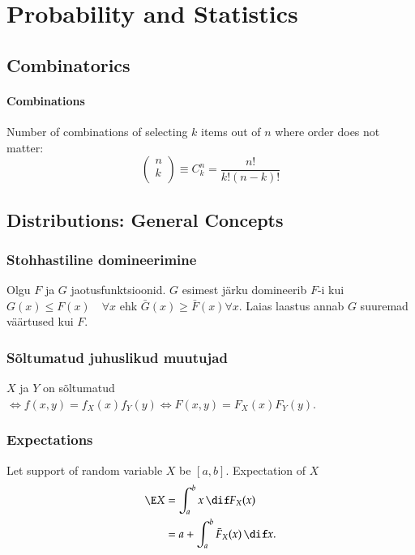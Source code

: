 \documentclass[a4paper]{article}
\numberwithin{equation}{subsection}
\begin{document}
\newpage
\section{Probability and Statistics}
\label{sec:probatility_and_statistics}

\subsection{Combinatorics}
\label{sec:combinatorics}

\paragraph{Combinations}

Number of combinations of selecting $k$ items out of $n$ where order
does not matter:
\begin{equation}
  \begin{pmatrix}
    n \\ k \\
  \end{pmatrix}
  \equiv
  C_{k}^{n}
  =
  \frac{n!}{k! (n-k)!}
\end{equation}

\subsection{Distributions: General Concepts}



\label{sec:jaotused_mqisted}

\subsubsection{Stohhastiline domineerimine}
Olgu $F$ ja $G$ jaotusfunktsioonid.  $G$ esimest järku domineerib
$F$-i kui $G(x) \le F(x) \quad \forall x$ ehk $\bar G(x) \ge \bar F(x)
\forall x$.  Laias laastus annab $G$ suuremad väärtused kui $F$.

\subsubsection{Sõltumatud juhuslikud muutujad}
$X$ ja $Y$ on sõltumatud $\Leftrightarrow f(x,y) = f_X(x) f_Y(y)
\Leftrightarrow F(x,y) = F_X(x) F_Y(y)$.

\subsubsection{Expectations}
Let support of random variable $X$ be $[a, b]$.  Expectation of $X$
\begin{align}
  \E X
  &=
  \int_a^b x \, \dif F_X(x)\\
  &=
  a + \int_a^b \bar F_X(x) \,\dif x.
\end{align}
\end{document}

